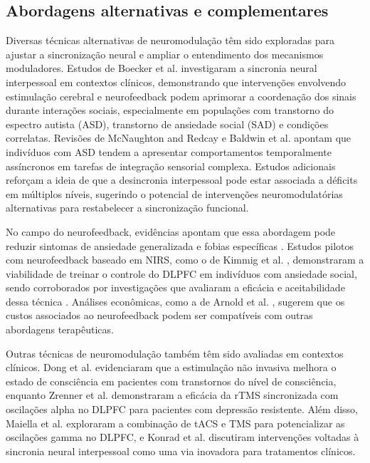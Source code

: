 \subsection{Abordagens alternativas e complementares}

Diversas técnicas alternativas de neuromodulação têm sido exploradas para ajustar a sincronização neural e ampliar o entendimento dos mecanismos moduladores. Estudos de Boecker et al. \cite{boecker2024interpersonal} investigaram a sincronia neural interpessoal em contextos clínicos, demonstrando que intervenções envolvendo estimulação cerebral e neurofeedback podem aprimorar a coordenação dos sinais durante interações sociais, especialmente em populações com transtorno do espectro autista (ASD), transtorno de ansiedade social (SAD) e condições correlatas. Revisões de McNaughton and Redcay \cite{mcnaughton2020interpersonal} e Baldwin et al. \cite{baldwin2014evidence} apontam que indivíduos com ASD tendem a apresentar comportamentos temporalmente assíncronos em tarefas de integração sensorial complexa. Estudos adicionais \cite{gerloff2022autism, quinones2021dysfunction, key2022greater, tanabe2012hard} reforçam a ideia de que a desincronia interpessoal pode estar associada a déficits em múltiplos níveis, sugerindo o potencial de intervenções neuromodulatórias alternativas para restabelecer a sincronização funcional.

No campo do neurofeedback, evidências apontam que essa abordagem pode reduzir sintomas de ansiedade generalizada e fobias específicas \cite{hou2021neurofeedback, zilverstand2015fmri}. Estudos pilotos com neurofeedback baseado em NIRS, como o de Kimmig et al. \cite{kimmig2019feasibility}, demonstraram a viabilidade de treinar o controle do DLPFC em indivíduos com ansiedade social, sendo corroborados por investigações que avaliaram a eficácia e aceitabilidade dessa técnica \cite{direito2021training, steiner2014pilot, lamarca2018facilitating, catala2017treatment}. Análises econômicas, como a de Arnold et al. \cite{arnold2013eeg}, sugerem que os custos associados ao neurofeedback podem ser compatíveis com outras abordagens terapêuticas.

Outras técnicas de neuromodulação também têm sido avaliadas em contextos clínicos. Dong et al. \cite{dong2023efficacy} evidenciaram que a estimulação não invasiva melhora o estado de consciência em pacientes com transtornos do nível de consciência, enquanto Zrenner et al. \cite{zrenner2020brain} demonstraram a eficácia da rTMS sincronizada com oscilações alpha no DLPFC para pacientes com depressão resistente. Além disso, Maiella et al. \cite{maiella2022simultaneous} exploraram a combinação de tACS e TMS para potencializar as oscilações gamma no DLPFC, e Konrad et al. \cite{konrad2024interpersonal} discutiram intervenções voltadas à sincronia neural interpessoal como uma via inovadora para tratamentos clínicos.

